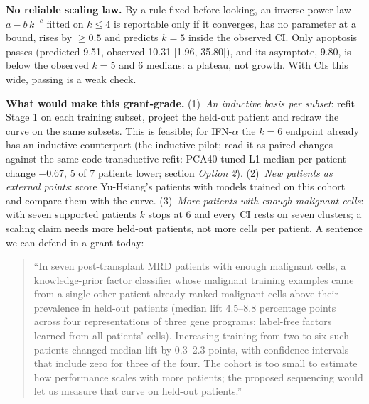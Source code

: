 \textbf{No reliable scaling law.} By a rule fixed before looking, an inverse power law $a - b\,k^{-c}$ fitted on $k \le 4$ is reportable only if it converges, has no parameter at a bound, rises by $\geq 0.5$\pp{} and predicts $k = 5$ inside the observed CI. Only apoptosis passes (predicted 9.51\pp{}, observed 10.31 [1.96, 35.80]), and its asymptote, 9.80\pp{}, is below the observed $k = 5$ and 6 medians: a plateau, not growth. With CIs this wide, passing is a weak check.

\textbf{What would make this grant-grade.}
(1)~\emph{An inductive basis per subset}: refit Stage 1 on each training subset, project the held-out patient and redraw the curve on the same subsets. This is feasible; for IFN-$\alpha$ the $k = 6$ endpoint already has an inductive counterpart (the inductive pilot; read it as paired changes against the same-code transductive refit: PCA40 tuned-L1 median per-patient change $-0.67$\pp, 5 of 7 patients lower; section \emph{Option 2}).
(2)~\emph{New patients as external points}: score Yu-Hsiang's patients with models trained on this cohort and compare them with the curve.
(3)~\emph{More patients with enough malignant cells}: with seven supported patients $k$ stops at 6 and every CI rests on seven clusters; a scaling claim needs more held-out patients, not more cells per patient.
A sentence we can defend in a grant today:
\begin{quote}
``In seven post-transplant MRD patients with enough malignant cells, a knowledge-prior factor classifier whose malignant training examples came from a single other patient already ranked malignant cells above their prevalence in held-out patients (median lift 4.5--8.8 percentage points across four representations of three gene programs; label-free factors learned from all patients' cells). Increasing training from two to six such patients changed median lift by 0.3--2.3 points, with confidence intervals that include zero for three of the four. The cohort is too small to estimate how performance scales with more patients; the proposed sequencing would let us measure that curve on held-out patients.''
\end{quote}

